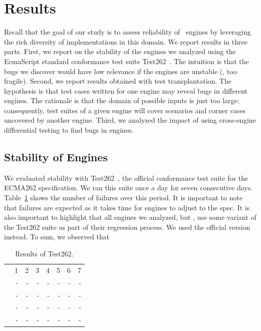 \documentclass[10pt,conference,anonymous]{IEEEtran}
\begin{document}
\section{Results}
\label{sec:results}

Recall that the goal of our study is to assess reliability of
\js\ engines by leveraging the rich diversity of implementations in
this domain. We report results in three parts. First, we report on the
stability of the engines we analyzed using the EcmaScript standard
conformance test suite Test262~\cite{ecma262-conformance-suite}. The
intuition is that the bugs we discover would have low relevance if the
engines are unstable (\ie{}, too fragile). Second, we report results
obtained with test transplantation. The hypothesis is that test cases
written for one engine may reveal bugs in different engines. The
rationale is that the domain of possible inputs is just too large;
consequently, test suites of a given engine will cover scenarios and
corner cases uncovered by another engine.  Third, we analyzed the
impact of using cross-engine differential testing to find bugs in
\js{} engines. 

\subsection{Stability of Engines}

We evaluated stability with Test262~\cite{ecma262-conformance-suite},
the official \js{} conformance test suite for the ECMA262
specification. We ran this suite once a day for seven consecutive
days. Table~\ref{tab:test262} shows the number of failures over this
period. It is important to note that failures are expected as it takes
time for engines to adjust to the spec. It is also important to
highlight that all engines we analyzed, but \chakra{}, use some
variant of the Test262 suite as part of their regression
process. We used the official version
instead. To sum, we observed
that  

\begin{table}[h]
  \centering
  \caption{\label{tab:test262}Results of Test262.}
  \begin{tabular}{crrrrrrr}
    \toprule
           & 1 & 2 & 3 & 4 & 5 & 6 & 7 \\
    \jsc{} & - & - & - & - & - & - & - \\
    \veight{} & - & - & - & - & - & - & - \\
    \chakra{} & - & - & - & - & - & - & - \\
    \smonkey{} & - & - & - & - & - & - & - \\
    \bottomrule 
  \end{tabular}
\end{table}
\end{document}
